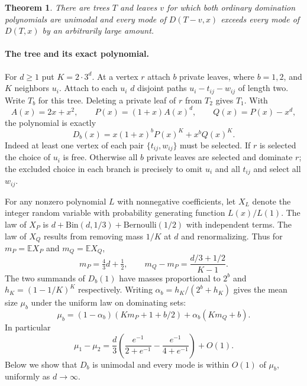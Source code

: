 \documentclass[11pt,a4paper]{article}
\newtheorem{theorem}{Theorem}[section]
\numberwithin{equation}{section}
\begin{document}
\begin{theorem}\label{th:tree-leaf-mode}
There are trees $T$ and leaves $v$ for which both ordinary domination
polynomials are unimodal and every mode of $D(T-v,x)$ exceeds every
mode of $D(T,x)$ by an arbitrarily large amount.
\end{theorem}

\paragraph{The tree and its exact polynomial.}
For $d\ge1$ put $K=2\cdot3^d$. At a vertex $r$ attach $b$ private
leaves, where $b=1,2$, and $K$ neighbors $u_i$. Attach to each $u_i$
$d$ disjoint paths $u_i-t_{ij}-w_{ij}$ of length two. Write $T_b$
for this tree. Deleting a private leaf of $r$ from $T_2$ gives $T_1$.
With
\[
 A(x)=2x+x^2,\qquad P(x)=(1+x)A(x)^d,\qquad Q(x)=P(x)-x^d,
\]
the polynomial is exactly
\[
 D_b(x)=x(1+x)^bP(x)^K+x^b Q(x)^K.
\]
Indeed at least one vertex of each pair $\{t_{ij},w_{ij}\}$ must be
selected. If $r$ is selected the choice of $u_i$ is free. Otherwise
all $b$ private leaves are selected and dominate $r$; the excluded
choice in each branch is precisely to omit $u_i$ and all $t_{ij}$
and select all $w_{ij}$.

For any nonzero polynomial $L$ with nonnegative coefficients, let
$X_L$ denote the integer random variable with probability generating
function $L(x)/L(1)$. The law of $X_P$ is
$d+\mathrm{Bin}(d,1/3)+\mathrm{Bernoulli}(1/2)$ with independent
terms. The law of $X_Q$ results from removing mass $1/K$ at $d$ and
renormalizing. Thus for $m_P=\mathbb E X_P$ and $m_Q=\mathbb E X_Q$,
\[
 m_P=\tfrac43d+\tfrac12,\qquad
 m_Q-m_P=\frac{d/3+1/2}{K-1}.
\]
The two summands of $D_b(1)$ have masses proportional to $2^b$ and
$h_K=(1-1/K)^K$ respectively. Writing $\alpha_b=h_K/(2^b+h_K)$
gives the mean size $\mu_b$ under the uniform law on dominating sets:
\[
 \mu_b=(1-\alpha_b)(Km_P+1+b/2)+\alpha_b(Km_Q+b).
\]
In particular
\[
 \mu_1-\mu_2=
 \frac d3\left(\frac{e^{-1}}{2+e^{-1}}-
               \frac{e^{-1}}{4+e^{-1}}\right)+O(1).
 \tag{*}\label{leaf:gap}
\]
Below we show that $D_b$ is unimodal and every mode is within $O(1)$
of $\mu_b$, uniformly as $d\to\infty$.
\end{document}
